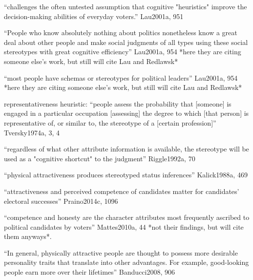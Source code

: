 		``challenges the often untested assumption that cognitive "heuristics" improve the decision-making abilities of everyday voters.'' Lau2001a, 951




	
	

		``People who know absolutely nothing about politics nonetheless know a great deal about other people and make social judgments of all types using these social stereotypes with great cognitive efficiency'' Lau2001a, 954 *here they are citing someone else's work, but still will cite Lau and Redlawsk*

		``most people have schemas or stereotypes for political leaders'' Lau2001a, 954 *here they are citing someone else's work, but still will cite Lau and Redlawsk*

		representativeness heuristic: ``people assess the probability that [someone] is engaged in a particular occupation [assessing] the degree to which [that person] is representative of, or similar to, the stereotype of a [certain profession]'' Tversky1974a, 3, 4

		``regardless of what other attribute information is available, the stereotype will be used as a "cognitive shortcut" to the judgment'' Riggle1992a, 70

		``physical attractiveness produces stereotyped status inferences'' Kalick1988a, 469

		``attractiveness and perceived competence of candidates matter for candidates’ electoral successes'' Praino2014c, 1096



		``competence and honesty are the character attributes most frequently ascribed to political candidates by voters'' Mattes2010a, 44 *not their findings, but will cite them anyways*.	


		``In general, physically attractive people are thought to possess more desirable personality traits that translate into other advantages. For example, good-looking people earn more over their lifetimes'' Banducci2008, 906

